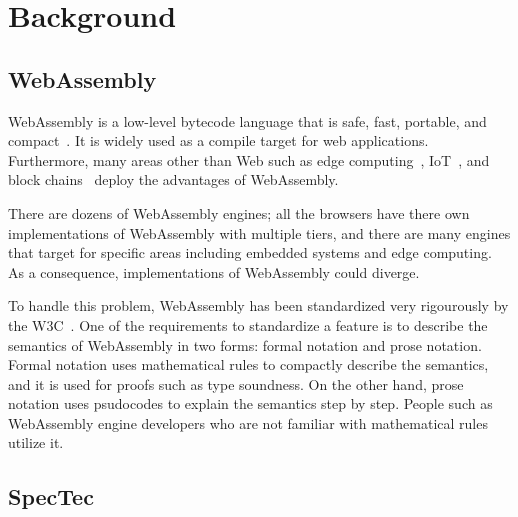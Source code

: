 
\chapter{Background}
\label{ch:background}
\noindent


\section{WebAssembly}

WebAssembly is a low-level bytecode language that is safe, fast, portable, and
compact~\cite{wasm}.
It is widely used as a compile target for web applications.
Furthermore, many areas other than Web such as edge computing~\cite{wasm-edge},
IoT~\cite{wasm-iot}, and block chains~\cite{wasm-block} deploy the advantages
of WebAssembly.

There are dozens of WebAssembly engines; all the browsers have there own
implementations of WebAssembly with multiple tiers, and there are many engines
that target for specific areas including embedded systems and edge computing.
As a consequence, implementations of WebAssembly could diverge.

To handle this problem, WebAssembly has been standardized very rigourously by
the W3C~\cite{wasm-w3c}.
One of the requirements to standardize a feature is to describe the semantics
of WebAssembly in two forms: formal notation and prose notation.
Formal notation uses mathematical rules to compactly describe the semantics,
and it is used for proofs such as type soundness.
On the other hand, prose notation uses psudocodes to explain the semantics
step by step.
People such as WebAssembly engine developers who are not familiar with
mathematical rules utilize it.





\section{SpecTec}
